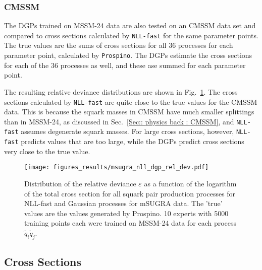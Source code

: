 \documentclass[twoside,english]{uiofysmaster}
\begin{document}
\subsubsection{CMSSM}

The DGPs trained on MSSM-24 data are also tested on an CMSSM data set and compared to cross sections calculated by \verb|NLL-fast| for the same parameter points. The true values are the sums of cross sections for all 36 processes for each parameter point, calculated by \verb|Prospino|. The DGPs estimate the cross sections for each of the 36 processes as well, and these ase summed for each parameter point. 

The resulting relative deviance distributions are shown in Fig.~\ref{Fig:: results : RD CMSSM}. The cross sections calculated by \verb|NLL-fast| are quite close to the true values for the CMSSM data. This is because the squark masses in CMSSM have much smaller splittings than in MSSM-24, as discussed in Sec.~\ref{Sec:: physics back : CMSSM}, and \verb|NLL-fast| assumes degenerate squark masses. For large cross sections, however, \verb|NLL-fast| predicts values that are too large, while the DGPs predict cross sections very close to the true value.

\begin{figure}
\centering
\texttt{[image: figures\_results/msugra\_nll\_dgp\_rel\_dev.pdf]}
\caption{Distribution of the relative deviance $\varepsilon$ as a function of the logarithm of the total cross section for all squark pair production processes for NLL-fast and Gaussian processes for mSUGRA data. The 'true' values are the values generated by Prospino. 10 experts with 5000 training points each were trained on MSSM-24 data for each process $\widetilde{q}_i \widetilde{q}_j$.}
\label{Fig:: results : RD CMSSM}
\end{figure}

\subsection{Cross Sections}
\end{document}
